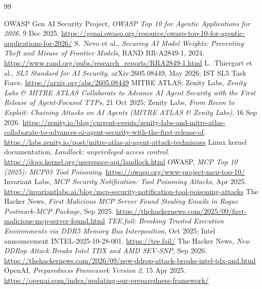 \documentclass[11pt,letterpaper]{article}
\begin{document}
\begingroup
\footnotesize{}
\renewcommand{\refname}{References}
\begin{thebibliography}{99}
\setlength{\itemsep}{1.5pt}

 OWASP Gen AI Security Project, \emph{OWASP Top 10 for Agentic Applications for 2026}, 9 Dec 2025. \url{https://genai.owasp.org/resource/owasp-top-10-for-agentic-applications-for-2026/}
 S.~Nevo et al., \emph{Securing AI Model Weights: Preventing Theft and Misuse of Frontier Models}, RAND RR-A2849-1, 2024. \url{https://www.rand.org/pubs/research_reports/RRA2849-1.html}
 L.~Thiergart et al., \emph{SL5 Standard for AI Security}, arXiv:2605.08449, May 2026; IST SL5 Task Force. \url{https://arxiv.org/abs/2605.08449}
 MITRE ATLAS; Zenity Labs, \emph{Zenity Labs \& MITRE ATLAS Collaborate to Advance AI Agent Security with the First Release of Agent-Focused TTPs}, 21 Oct 2025; Zenity Labs, \emph{From Recon to Exploit: Chaining Attacks on AI Agents (MITRE ATLAS \& Zenity Labs)}, 16 Sep 2026. \url{https://zenity.io/blog/current-events/zenity-labs-and-mitre-atlas-collaborate-to-advances-ai-agent-security-with-the-first-release-of}, \url{https://labs.zenity.io/post/mitre-atlas-ai-agent-attack-techniques}
 Linux kernel documentation, \emph{Landlock: unprivileged access control}. \url{https://docs.kernel.org/userspace-api/landlock.html}
 OWASP, \emph{MCP Top 10 (2025): MCP03 Tool Poisoning}. \url{https://owasp.org/www-project-mcp-top-10/}
 Invariant Labs, \emph{MCP Security Notification: Tool Poisoning Attacks}, Apr 2025. \url{https://invariantlabs.ai/blog/mcp-security-notification-tool-poisoning-attacks}
 The Hacker News, \emph{First Malicious MCP Server Found Stealing Emails in Rogue Postmark-MCP Package}, Sep 2025. \url{https://thehackernews.com/2025/09/first-malicious-mcp-server-found.html}
 \emph{TEE.fail: Breaking Trusted Execution Environments via DDR5 Memory Bus Interposition}, Oct 2025; Intel announcement INTEL-2025-10-28-001. \url{https://tee.fail/}
 The Hacker News, \emph{New DDRop Attack Breaks Intel TDX and AMD SEV-SNP}, Sep 2026. \url{https://thehackernews.com/2026/09/new-ddrop-attack-breaks-intel-tdx-and.html}
 OpenAI, \emph{Preparedness Framework Version 2}, 15 Apr 2025. \url{https://openai.com/index/updating-our-preparedness-framework/}

\end{thebibliography}
\end{document}
